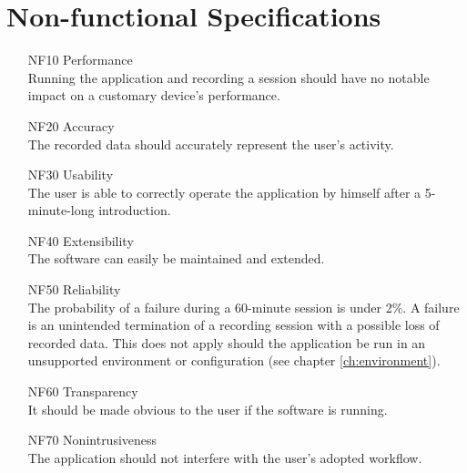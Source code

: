 \chapter{Non-functional Specifications}
\label{ch:nonfunc}
\begin{itemize}
    \item[NF10] Performance\\Running the application and recording a session should have no notable impact on a customary device's performance.
    \item[NF20] Accuracy\\The recorded data should accurately represent the user's activity.
    \item[NF30] Usability\\The user is able to correctly operate the application by himself after a 5-minute-long introduction.
    \item[NF40] Extensibility\\The software can easily be maintained and extended.
    \item[NF50] Reliability\\The probability of a failure during a 60-minute session is under 2\%. A failure is an unintended termination of a recording session with a possible loss of recorded data. This does not apply should the application be run in an unsupported environment or configuration (see chapter \ref{ch:environment}).%
    \item[NF60] Transparency\\It should be made obvious to the user if the software is running.
    \item[NF70] Nonintrusiveness\\The application should not interfere with the user's adopted workflow.
\end{itemize}